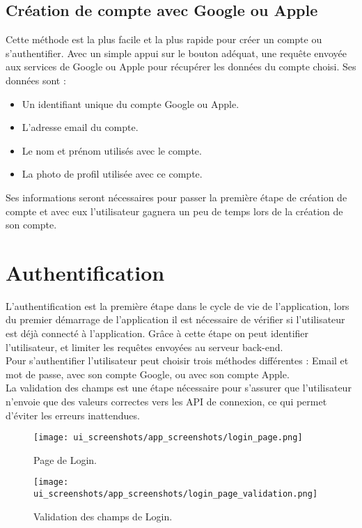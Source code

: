 \subsection{Création de compte avec Google ou Apple}
Cette méthode est la plus facile et la plus rapide pour créer un compte ou s'authentifier. Avec un simple appui sur le bouton adéquat, une requête envoyée aux services de Google ou Apple pour récupérer les données du compte choisi. Ses données sont :
\begin{itemize}
    \item Un identifiant unique du compte Google ou Apple.
    \item L'adresse email du compte.
    \item Le nom et prénom utilisés avec le compte.
    \item La photo de profil utilisée avec ce compte.
\end{itemize}
Ses informations seront nécessaires pour passer la première étape de création de compte et avec eux l'utilisateur gagnera un peu de temps lors de la création de son compte.
\vspace{1cm}

\section{Authentification}
L'authentification est la première étape dans le cycle de vie de l'application, lors du premier démarrage de l'application il est nécessaire de vérifier si l'utilisateur est déjà connecté à l'application. Grâce à cette étape on peut identifier l'utilisateur, et limiter les requêtes envoyées au serveur back-end.\\
\noindent Pour s'authentifier l'utilisateur peut choisir trois méthodes différentes : Email et mot de passe, avec son compte Google, ou avec son compte Apple.\\
La validation des champs est une étape nécessaire pour s'assurer que l'utilisateur n'envoie que des valeurs correctes vers les API de connexion, ce qui permet d'éviter les erreurs inattendues.
\vspace{1cm}
\begin{center}
    \begin{multicols}{2}
        \begin{figure}[H]
            \centering
            \texttt{[image: ui\_screenshots/app\_screenshots/login\_page.png]}
            \vspace{1cm}
            \captionsetup{justification=centering}
            \caption{Page de Login.}
            \label{fig:app_login}
        \end{figure}
        \begin{figure}[H]
            \centering
            \texttt{[image: ui\_screenshots/app\_screenshots/login\_page\_validation.png]}
            \vspace{1cm}
            \captionsetup{justification=centering}
            \caption{Validation des champs de Login.}
            \label{fig:app_login_validation}
        \end{figure}
    \end{multicols}
\end{center}

